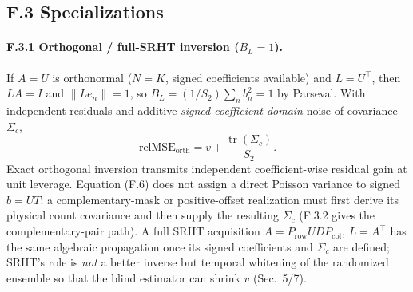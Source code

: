 \subsection{F.3 Specializations}

\paragraph{F.3.1 Orthogonal / full-SRHT inversion ($B_L=1$).} If $A=U$ is orthonormal ($N=K$, signed coefficients available) and $L=U^\top$, then $LA=I$ and $\|Le_n\|=1$, so $B_L=(1/S_2)\sum_n b_n^2=1$ by Parseval. With independent residuals and additive \emph{signed-coefficient-domain} noise of covariance $\Sigma_c$,
\begin{equation}
\mathrm{relMSE}_{\mathrm{orth}}=v+\frac{\operatorname{tr}(\Sigma_c)}{S_2}. \tag{F.6}
\end{equation}
Exact orthogonal inversion transmits independent coefficient-wise residual gain at unit leverage. Equation (F.6) does not assign a direct Poisson variance to signed $b=UT$: a complementary-mask or positive-offset realization must first derive its physical count covariance and then supply the resulting $\Sigma_c$ (F.3.2 gives the complementary-pair path). A full SRHT acquisition $A=P_{\mathrm{row}}UDP_{\mathrm{col}}$, $L=A^\top$ has the same algebraic propagation once its signed coefficients and $\Sigma_c$ are defined; SRHT's role is \emph{not} a better inverse but temporal whitening of the randomized ensemble so that the blind estimator can shrink $v$ (Sec.~5/7).

